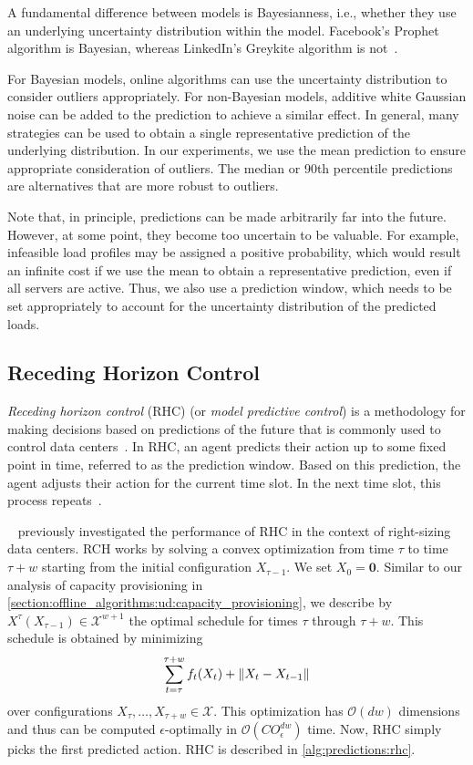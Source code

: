 A fundamental difference between models is Bayesianness, i.e., whether they use an underlying uncertainty distribution within the model. Facebook's Prophet algorithm is Bayesian, whereas LinkedIn's Greykite algorithm is not~\cite{Taylor2017, Hosseini2021}.

For Bayesian models, online algorithms can use the uncertainty distribution to consider outliers appropriately. For non-Bayesian models, additive white Gaussian noise can be added to the prediction to achieve a similar effect. In general, many strategies can be used to obtain a single representative prediction of the underlying distribution. In our experiments, we use the mean prediction to ensure appropriate consideration of outliers. The median or 90th percentile predictions are alternatives that are more robust to outliers.

Note that, in principle, predictions can be made arbitrarily far into the future. However, at some point, they become too uncertain to be valuable. For example, infeasible load profiles may be assigned a positive probability, which would result an infinite cost if we use the mean to obtain a representative prediction, even if all servers are active. Thus, we also use a prediction window, which needs to be set appropriately to account for the uncertainty distribution of the predicted loads.

\subsection{Receding Horizon Control}

\emph{Receding horizon control} (RHC) (or \emph{model predictive control}) is a methodology for making decisions based on predictions of the future that is commonly used to control data centers~\cite{Lin2012}. In RHC, an agent predicts their action up to some fixed point in time, referred to as the prediction window. Based on this prediction, the agent adjusts their action for the current time slot. In the next time slot, this process repeats~\cite{Zak2017}.

\citeauthor*{Lin2012}~\cite{Lin2012} previously investigated the performance of RHC in the context of right-sizing data centers. RCH works by solving a convex optimization from time $\tau$ to time $\tau + w$ starting from the initial configuration $X_{\tau-1}$. We set $X_0 = \mathbf{0}$. Similar to our analysis of capacity provisioning in \cref{section:offline_algorithms:ud:capacity_provisioning}, we describe by $X^{\tau}(X_{\tau-1}) \in \mathcal{X}^{w+1}$ the optimal schedule for times $\tau$ through $\tau+w$. This schedule is obtained by minimizing \begin{align}\label{eq:rhc}
    \sum_{t=\tau}^{\tau+w} f_t(X_t) + \lVert X_t - X_{t-1}\rVert
\end{align} over configurations $X_{\tau}, \dots, X_{\tau+w} \in \mathcal{X}$. This optimization has $\mathcal{O}(d w)$ dimensions and thus can be computed $\epsilon$-optimally in $\mathcal{O}(C O_{\epsilon}^{dw})$ time. Now, RHC simply picks the first predicted action. RHC is described in \cref{alg:predictions:rhc}.

